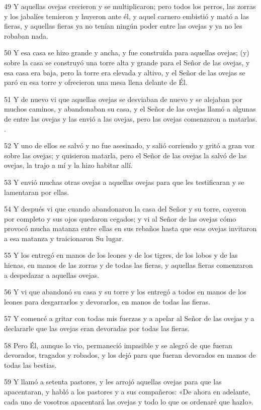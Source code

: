 \par 49 Y aquellas ovejas crecieron y se multiplicaron; pero todos los perros, las zorras y los jabalíes temieron y huyeron ante él, y aquel carnero embistió y mató a las fieras, y aquellas fieras ya no tenían ningún poder entre las ovejas y ya no les robaban nada.
\par 50 Y esa casa se hizo grande y ancha, y fue construida para aquellas ovejas; (y) sobre la casa se construyó una torre alta y grande para el Señor de las ovejas, y esa casa era baja, pero la torre era elevada y altivo, y el Señor de las ovejas se paró en esa torre y ofrecieron una mesa llena delante de Él.
\par 51 Y de nuevo vi que aquellas ovejas se desviaban de nuevo y se alejaban por muchos caminos, y abandonaban su casa, y el Señor de las ovejas llamó a algunas de entre las ovejas y las envió a las ovejas, pero las ovejas comenzaron a matarlas. .
\par 52 Y uno de ellos se salvó y no fue asesinado, y salió corriendo y gritó a gran voz sobre las ovejas; y quisieron matarla, pero el Señor de las ovejas la salvó de las ovejas, la trajo a mí y la hizo habitar allí.
\par 53 Y envió muchas otras ovejas a aquellas ovejas para que les testificaran y se lamentaran por ellas.
\par 54 Y después vi que cuando abandonaron la casa del Señor y su torre, cayeron por completo y sus ojos quedaron cegados; y vi al Señor de las ovejas cómo provocó mucha matanza entre ellas en sus rebaños hasta que esas ovejas invitaron a esa matanza y traicionaron Su lugar.
\par 55 Y los entregó en manos de los leones y de los tigres, de los lobos y de las hienas, en manos de las zorras y de todas las fieras, y aquellas fieras comenzaron a despedazar a aquellas ovejas.
\par 56 Y vi que abandonó su casa y su torre y los entregó a todos en manos de los leones para desgarrarlos y devorarlos, en manos de todas las fieras.
\par 57 Y comencé a gritar con todas mis fuerzas y a apelar al Señor de las ovejas y a declararle que las ovejas eran devoradas por todas las fieras.
\par 58 Pero Él, aunque lo vio, permaneció impasible y se alegró de que fueran devorados, tragados y robados, y los dejó para que fueran devorados en manos de todas las bestias.
\par 59 Y llamó a setenta pastores, y les arrojó aquellas ovejas para que las apacentaran, y habló a los pastores y a sus compañeros: «De ahora en adelante, cada uno de vosotros apacentará las ovejas y todo lo que os ordenaré que hazlo».
